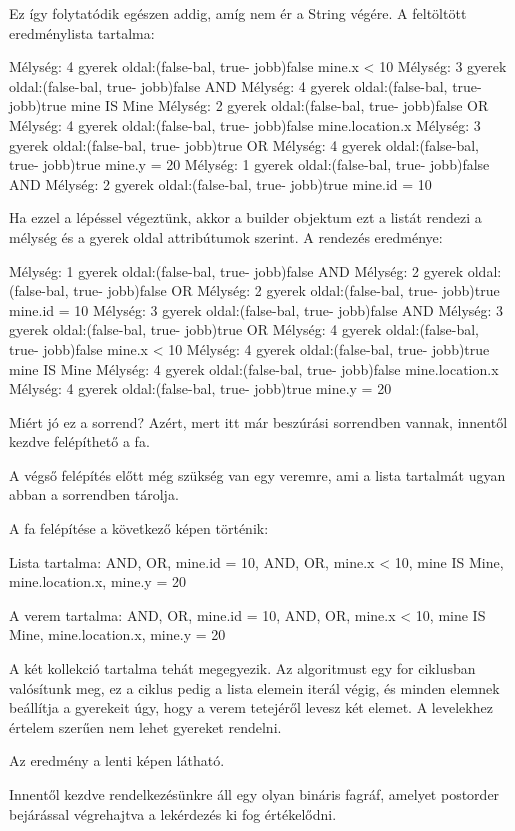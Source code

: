 Ez így folytatódik egészen addig, amíg nem ér a String végére. A feltöltött eredménylista tartalma:

Mélység: 4 gyerek oldal:(false-bal, true- jobb)false mine.x < 10
Mélység: 3 gyerek oldal:(false-bal, true- jobb)false  AND
Mélység: 4 gyerek oldal:(false-bal, true- jobb)true mine IS Mine 
Mélység: 2 gyerek oldal:(false-bal, true- jobb)false  OR
Mélység: 4 gyerek oldal:(false-bal, true- jobb)false mine.location.x 
Mélység: 3 gyerek oldal:(false-bal, true- jobb)true  OR
Mélység: 4 gyerek oldal:(false-bal, true- jobb)true mine.y = 20 
Mélység: 1 gyerek oldal:(false-bal, true- jobb)false  AND
Mélység: 2 gyerek oldal:(false-bal, true- jobb)true mine.id = 10 

Ha ezzel a lépéssel végeztünk, akkor a builder objektum ezt a listát rendezi a mélység és a gyerek oldal attribútumok szerint.
A rendezés eredménye:

Mélység: 1 gyerek oldal:(false-bal, true- jobb)false AND
Mélység: 2 gyerek oldal:(false-bal, true- jobb)false OR
Mélység: 2 gyerek oldal:(false-bal, true- jobb)true mine.id = 10
Mélység: 3 gyerek oldal:(false-bal, true- jobb)false AND
Mélység: 3 gyerek oldal:(false-bal, true- jobb)true OR
Mélység: 4 gyerek oldal:(false-bal, true- jobb)false mine.x < 10
Mélység: 4 gyerek oldal:(false-bal, true- jobb)true mine IS Mine
Mélység: 4 gyerek oldal:(false-bal, true- jobb)false mine.location.x
Mélység: 4 gyerek oldal:(false-bal, true- jobb)true mine.y = 20

Miért jó ez a sorrend? 
Azért, mert itt már beszúrási sorrendben vannak, innentől kezdve felépíthető a fa.

A végső felépítés előtt még szükség van egy veremre, ami a lista tartalmát ugyan abban a sorrendben tárolja.

A fa felépítése a következő képen történik:

Lista tartalma: AND, OR, mine.id = 10, AND, OR, mine.x < 10, mine IS Mine, mine.location.x, mine.y = 20

A verem tartalma: AND, OR, mine.id = 10, AND, OR, mine.x < 10, mine IS Mine, mine.location.x, mine.y = 20

A két kollekció tartalma tehát megegyezik. Az algoritmust egy for ciklusban valósítunk meg, ez a ciklus pedig a lista elemein iterál végig, és minden elemnek beállítja a gyerekeit úgy, hogy a verem tetejéről levesz két elemet.
A levelekhez értelem szerűen nem lehet gyereket rendelni.

Az eredmény a lenti képen látható.

Innentől kezdve rendelkezésünkre áll egy olyan bináris fagráf, amelyet postorder bejárással végrehajtva a lekérdezés ki fog értékelődni.



